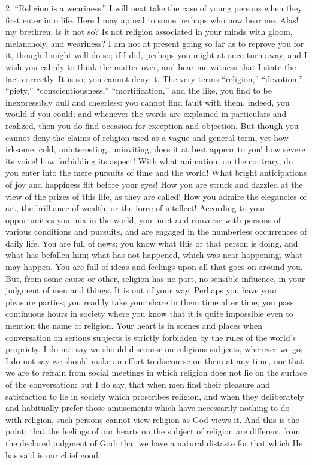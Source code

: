 2. ``Religion is a weariness.'' I will next take the case
of young persons when they first enter into life. Here I may appeal to
some perhaps who now hear me. Alas! my brethren, is it not so? Is not
religion associated in your minds with gloom, melancholy, and
weariness? I am not at present going so far as to reprove you for it,
though I might well do so; if I did, perhaps you might at once turn
away, and I wish you calmly to think the matter over, and bear me
witness that I state the fact correctly. It is so; you cannot deny it.
The very terms ``religion,'' ``devotion,''
``piety,'' ``conscientiousness,''
``mortification,'' and the like, you find to be inexpressibly
dull and cheerless: you cannot find fault with them, indeed, you would
if you could; and whenever the words are explained in particulars and
realized, then you do find occasion for exception and objection. But
though you cannot deny the claims of religion used as a vague and
general term, yet how irksome, cold, uninteresting, uninviting, does
it at best appear to you! how severe its voice! how forbidding its
aspect! With what animation, on the contrary, do you enter into the
mere pursuits of time and the world! What bright anticipations of joy
and happiness flit before your eyes! How you are struck and dazzled at
the view of the prizes of this life, as they are called! How you
admire the elegancies of art, the brilliance of wealth, or the force
of intellect! According to your opportunities you mix in the world,
you meet and converse with persons of various conditions and pursuits,
and are engaged in the numberless occurrences of daily life. You are
full of news; you know what this or that person is doing, and what has
befallen him; what has not happened, which was near happening, what
may happen. You are full of ideas and feelings upon all that goes on
around you. But, from some cause or other, religion has no part, no
sensible influence, in your judgment of men and things. It is out of
your way. Perhaps you have your pleasure parties; you readily take
your share in them time after time; you pass continuous hours in
society where you know that it is quite impossible even to mention the
name of religion. Your heart is in scenes and places when conversation
on serious subjects is strictly forbidden by the rules of the world's
propriety. I do not say we should discourse on religious subjects,
wherever we go; I do not say we should make an effort to discourse on
them at any time, nor that we are to refrain from social meetings in
which religion does not lie on the surface of the conversation: but I
do say, that when men find their pleasure and satisfaction to lie in
society which proscribes religion, and when they deliberately and
habitually prefer those amusements which have necessarily nothing to
do with religion, such persons cannot view religion as God views it.
And this is the point: that the feelings of our hearts on the subject
of religion are different from the declared judgment of God; that we
have a natural distaste for that which He has said is our chief good.

